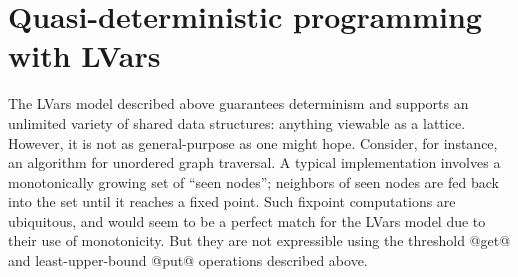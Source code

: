 \section{Quasi-deterministic programming with LVars}\label{s:intro-quasi}

The LVars model described above guarantees determinism and supports an
unlimited variety of shared data structures: anything viewable as a
lattice.  However, it is not as general-purpose as one might hope.
Consider, for instance, an algorithm for unordered graph traversal.  A
typical implementation involves a monotonically growing set of ``seen
nodes''; neighbors of seen nodes are fed back into the set until it
reaches a fixed point.  Such fixpoint computations are ubiquitous, and
would seem to be a perfect match for the LVars model due to their use
of monotonicity.  But they are not expressible using the threshold
@get@ and least-upper-bound @put@ operations described above.

